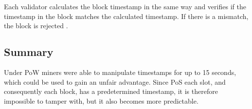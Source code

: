 Each validator calculates the block timestamp in the same way and verifies if
the timestamp in the block matches the calculated timestamp. If there is a
mismatch, the block is rejected \cite{process-execution-payload}.

\subsection{Summary}

Under PoW miners were able to manipulate timestamps for up to 15 seconds, which
could be used to gain an unfair advantage. Since PoS each slot, and
consequently each block, has a predetermined timestamp, it is
therefore impossible to tamper with, but it also becomes more predictable.

